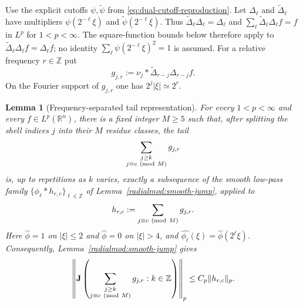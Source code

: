 \documentclass[11pt]{article}
\numberwithin{equation}{section}
\newtheorem{lemma}[theorem]{Lemma}
\theoremstyle{remark}
\theoremstyle{definition}
\newcommand{\R}{\mathbb R}
\begin{document}
Use the explicit cutoffs $\psi,\widetilde\psi$ from
\eqref{eq:dual-cutoff-reproduction}. Let $\Delta_\ell$ and
$\widetilde\Delta_\ell$ have multipliers $\psi(2^{-\ell}\xi)$ and
$\widetilde\psi(2^{-\ell}\xi)$. Thus
$\widetilde\Delta_\ell\Delta_\ell=\Delta_\ell$ and
$\sum_\ell\widetilde\Delta_\ell\Delta_\ell f=f$ in $L^p$ for
$1<p<\infty$. The square-function bounds below therefore apply to
$\widetilde\Delta_\ell\Delta_\ell f=\Delta_\ell f$; no identity
$\sum_\ell\psi(2^{-\ell}\xi)^2=1$ is assumed. For a relative frequency
$r\in\mathbb Z$ put
\[
 g_{j,r}:=\nu_j*\widetilde\Delta_{r-j}\Delta_{r-j}f.
\]
On the Fourier support of $g_{j,r}$ one has $2^j|\xi|\simeq2^r$.

\begin{lemma}[Frequency-separated tail representation]
\label{lem:allq-separated-tail}
For every $1<p<\infty$ and every $f\in L^p(\R^n)$, there is a fixed
integer $M\ge5$ such that, after splitting the shell
indices $j$ into their $M$ residue classes, the tail
\[
 \sum_{\substack{j\ge k\\j\equiv c\ ({\rm mod}\ M)}}g_{j,r}
\]
is, up to repetitions as $k$ varies, exactly a subsequence of the smooth
low-pass family $\{\phi_\ell*h_{r,c}\}_{\ell\in\mathbb Z}$ of
Lemma~\ref{radialmod:smooth-jump}, applied to
\[
 h_{r,c}:=\sum_{j\equiv c\ ({\rm mod}\ M)}g_{j,r}.
\]
Here $\widehat\phi=1$ on $|\xi|\le2$ and
$\widehat\phi=0$ on $|\xi|>4$, and
$\widehat{\phi_\ell}(\xi)=\widehat\phi(2^\ell\xi)$.
Consequently, Lemma~\ref{radialmod:smooth-jump} gives
\begin{equation}\label{eq:allq-tail-jump-by-h}
 \left\|\mathbf J\left(
 \sum_{\substack{j\ge k\\j\equiv c\ ({\rm mod}\ M)}}g_{j,r}:k\in\mathbb Z
 \right)\right\|_p
 \le C_p\|h_{r,c}\|_p.
\end{equation}
\end{lemma}
\end{document}
